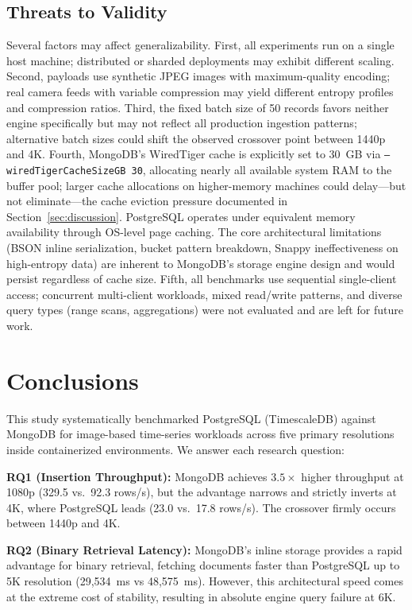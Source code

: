 \documentclass[conference, a4paper]{IEEEtran}
\begin{document}
\subsection{Threats to Validity}
Several factors may affect generalizability. First, all experiments run on a single host machine; distributed or sharded deployments may exhibit different scaling. Second, payloads use synthetic JPEG images with maximum-quality encoding; real camera feeds with variable compression may yield different entropy profiles and compression ratios. Third, the fixed batch size of 50 records favors neither engine specifically but may not reflect all production ingestion patterns; alternative batch sizes could shift the observed crossover point between 1440p and 4K. Fourth, MongoDB's WiredTiger cache is explicitly set to 30~GB via \texttt{--wiredTigerCacheSizeGB~30}, allocating nearly all available system RAM to the buffer pool; larger cache allocations on higher-memory machines could delay---but not eliminate---the cache eviction pressure documented in Section~\ref{sec:discussion}. PostgreSQL operates under equivalent memory availability through OS-level page caching. The core architectural limitations (BSON inline serialization, bucket pattern breakdown, Snappy ineffectiveness on high-entropy data) are inherent to MongoDB's storage engine design and would persist regardless of cache size. Fifth, all benchmarks use sequential single-client access; concurrent multi-client workloads, mixed read/write patterns, and diverse query types (range scans, aggregations) were not evaluated and are left for future work.

\section{Conclusions}
\label{sec:conclusions}

This study systematically benchmarked PostgreSQL (TimescaleDB) against MongoDB for image-based time-series workloads across five primary resolutions inside containerized environments. We answer each research question:

\textbf{RQ1 (Insertion Throughput):} MongoDB achieves $3.5\times$ higher throughput at 1080p (329.5 vs.\ 92.3 rows/s), but the advantage narrows and strictly inverts at 4K, where PostgreSQL leads (23.0 vs.\ 17.8 rows/s). The crossover firmly occurs between 1440p and 4K.

\textbf{RQ2 (Binary Retrieval Latency):} MongoDB's inline storage provides a rapid advantage for binary retrieval, fetching documents faster than PostgreSQL up to 5K resolution (29,534~ms vs 48,575~ms). However, this architectural speed comes at the extreme cost of stability, resulting in absolute engine query failure at 6K.
\end{document}

